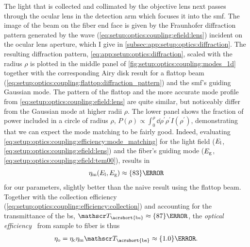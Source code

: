 The light that is collected and collimated by the objective lens next passes through the ocular lens in the detection arm which focuses it into the \gls{smf}.
The image of the beam on the fiber end face is given by the Fraunhofer diffraction pattern generated by the wave (\cref{eq:setup:optics:coupling:efield:lens}) incident on the ocular lens aperture, which I give in \cref{subsec:app:setup:optics:diffraction}.
The resulting diffraction pattern, \cref{eq:app:setup:optics:diffraction}, scaled with the radius $\rho$ is plotted in the middle panel of \cref{fig:setup:optics:coupling:modes_1d} together with the corresponding Airy disk result for a flattop beam (\cref{eq:setup:optics:coupling:flattop:diffraction_pattern}) and the \gls{smf}'s guiding Gaussian mode.
The pattern of the flattop and the more accurate mode profile from \cref{eq:setup:optics:coupling:efield:lens} are quite similar, but noticeably differ from the Gaussian mode at higher radii $\rho$.
The lower panel shows the fraction of power included in a circle of radius $\rho$, $P(\rho)\propto \int_0^{\rho}\dd{\rho^{\prime}} \rho^{\prime} I(\rho^{\prime})$, demonstrating that we can expect the mode matching to be fairly good.
Indeed, evaluating \cref{eq:setup:optics:coupling:efficiency:mode_matching} for the light field ($E_{\mathrm{l}}$, \cref{eq:setup:optics:coupling:efield:lens}) and the fiber's guiding mode ($E_{\mathrm{g}}$, \cref{eq:setup:optics:coupling:efield:tem00}), results in
\begin{equation}\label{eq:setup:optics:coupling:efficiency:mode_matching:eval}
    \eta_{\mr{m}}(E_{\mr{l}}, E_{\mr{g}})\approx\qty{83}{\percent}
\end{equation}
for our parameters, slightly better than the naive result using the flattop beam.
Together with the collection efficiency (\cref{eq:setup:optics:coupling:efficiency:collection}) and accounting for the transmittance of the \gls{bs}, $\transmittance_{\mr{\acrshort{bs}}}\approx\qty{87}{\percent}$,
the \emph{optical efficiency}~\cite{Sze2007} from sample to fiber is thus
\begin{equation}\label{eq:setup:optics:coupling:efficiency:optical}
    \eta_{\mr{o}} = \eta_{\mr{c}}\eta_{\mr{m}} \transmittance_{\mr{\acrshort{bs}}} \approx\qty{1.0}{\percent}.
\end{equation}

